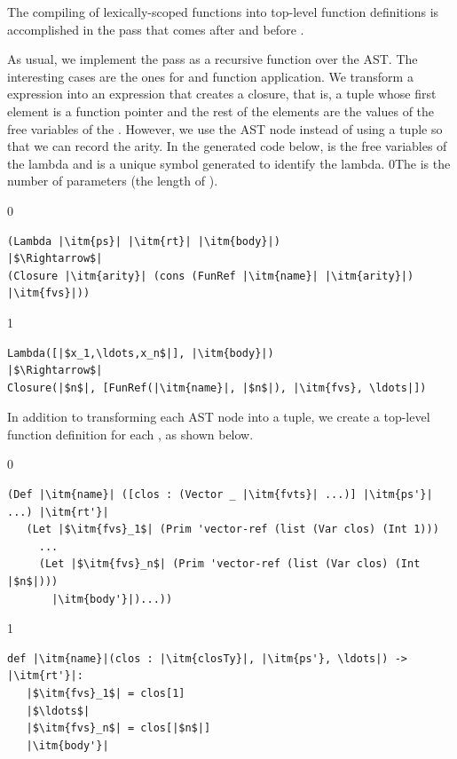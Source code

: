 \documentclass[7x10,nocrop]{TimesAPriori_MIT}%
\def\racketEd{0}
\def\pythonEd{1}
\def\edition{0}
\newcommand{\racket}[1]{{\if\edition\racketEd{#1}\fi}}
\begin{document}
The compiling of lexically-scoped functions into top-level function
definitions is accomplished in the pass 
that comes after  and before
. 

As usual, we implement the pass as a recursive function over the
AST. The interesting cases are the ones for  and function
application. We transform a  expression into an expression
that creates a closure, that is, a tuple whose first element is a
function pointer and the rest of the elements are the values of the
free variables of the .
%
However, we use the  AST node instead of using a tuple
so that we can record the arity.
%
In the generated code below,  is the free variables of the
lambda and  is a unique symbol generated to identify the lambda.
%
\racket{The  is the number of parameters (the length of
  \itm{ps}).}
%
{\if\edition\racketEd
\begin{lstlisting}
(Lambda |\itm{ps}| |\itm{rt}| |\itm{body}|)
|$\Rightarrow$|
(Closure |\itm{arity}| (cons (FunRef |\itm{name}| |\itm{arity}|) |\itm{fvs}|))
\end{lstlisting}
\fi}
%
{\if\edition\pythonEd
\begin{lstlisting}
Lambda([|$x_1,\ldots,x_n$|], |\itm{body}|)
|$\Rightarrow$|
Closure(|$n$|, [FunRef(|\itm{name}|, |$n$|), |\itm{fvs}, \ldots|])
\end{lstlisting}
\fi}
%
In addition to transforming each  AST node into a
tuple, we create a top-level function definition for each
, as shown below.\\
\begin{minipage}{0.8\textwidth}
{\if\edition\racketEd
\begin{lstlisting}
(Def |\itm{name}| ([clos : (Vector _ |\itm{fvts}| ...)] |\itm{ps'}| ...) |\itm{rt'}|
   (Let |$\itm{fvs}_1$| (Prim 'vector-ref (list (Var clos) (Int 1)))
     ...
     (Let |$\itm{fvs}_n$| (Prim 'vector-ref (list (Var clos) (Int |$n$|)))
       |\itm{body'}|)...))
\end{lstlisting}
\fi}
{\if\edition\pythonEd
\begin{lstlisting}
def |\itm{name}|(clos : |\itm{closTy}|, |\itm{ps'}, \ldots|) -> |\itm{rt'}|:
   |$\itm{fvs}_1$| = clos[1]
   |$\ldots$|
   |$\itm{fvs}_n$| = clos[|$n$|]
   |\itm{body'}|
\end{lstlisting}
\fi}
\end{minipage}\\
\end{document}
